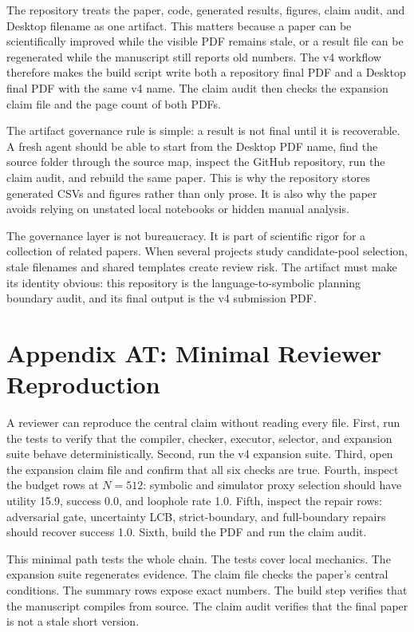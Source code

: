 \documentclass{article}
\begin{document}
The repository treats the paper, code, generated results, figures, claim audit,
and Desktop filename as one artifact. This matters because a paper can be
scientifically improved while the visible PDF remains stale, or a result file
can be regenerated while the manuscript still reports old numbers. The v4
workflow therefore makes the build script write both a repository final PDF and
a Desktop final PDF with the same v4 name. The claim audit then checks the
expansion claim file and the page count of both PDFs.

The artifact governance rule is simple: a result is not final until it is
recoverable. A fresh agent should be able to start from the Desktop PDF name,
find the source folder through the source map, inspect the GitHub repository,
run the claim audit, and rebuild the same paper. This is why the repository
stores generated CSVs and figures rather than only prose. It is also why the
paper avoids relying on unstated local notebooks or hidden manual analysis.

The governance layer is not bureaucracy. It is part of scientific rigor for a
collection of related papers. When several projects study candidate-pool
selection, stale filenames and shared templates create review risk. The
artifact must make its identity obvious: this repository is the
language-to-symbolic planning boundary audit, and its final output is the v4
submission PDF.

\section*{Appendix AT: Minimal Reviewer Reproduction}

A reviewer can reproduce the central claim without reading every file. First,
run the tests to verify that the compiler, checker, executor, selector, and
expansion suite behave deterministically. Second, run the v4 expansion suite.
Third, open the expansion claim file and confirm that all six checks are true.
Fourth, inspect the budget rows at $N=512$: symbolic and simulator proxy
selection should have utility 15.9, success 0.0, and loophole rate 1.0. Fifth,
inspect the repair rows: adversarial gate, uncertainty LCB, strict-boundary,
and full-boundary repairs should recover success 1.0. Sixth, build the PDF and
run the claim audit.

This minimal path tests the whole chain. The tests cover local mechanics. The
expansion suite regenerates evidence. The claim file checks the paper's central
conditions. The summary rows expose exact numbers. The build step verifies that
the manuscript compiles from source. The claim audit verifies that the final
paper is not a stale short version.
\end{document}
